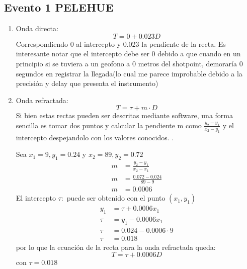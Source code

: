 \documentclass{article}
\theoremstyle{mytheoremstyle}
\theoremstyle{mytheoremstyle}
\theoremstyle{myproblemstyle}
\begin{document}
	\subsection*{Evento 1 PELEHUE}
	\begin{enumerate}
		\item Onda directa: \begin{equation*}
			T=0 + 0.023D
			\end{equation*}
			Correspondiendo 0 al intercepto y 0.023 la pendiente de la recta. Es interesante notar que el intercepto debe ser 0 debido a que 
			cuando en un principio si se tuviera a un geofono a 0 metros del shotpoint, demoraría 0 segundos en registrar la llegada(lo cual me parece improbable debido a la precisión y delay que presenta el instrumento)
		\item Onda refractada:\begin{equation*}
			T=\tau+m\cdot D
		\end{equation*}
		Si bien estas rectas pueden ser descritas mediante software, una forma sencilla es tomar dos puntos
		y calcular la pendiente m como $\frac{y_2-y_1}{x_2-y_1}$ y el intercepto despejandolo con los valores conocidos.
		.\par Sea $x_1=9,y_1=0.24$ y $x_2=89,y_2=0.72$  
		\begin{align*}
			m&=\frac{y_2-y_1}{x_2-x_1} \\
			m&=\frac{0.072-0.024}{89-9}\\ 
			m&=0.0006
		\end{align*}
		El intercepto $\tau:$ puede ser obtenido con el punto $(x_1,y_1)$
		\begin{align*}
			y_1&=\tau+0.0006x_1 \\
			\tau&=y_1-0.0006x_1 \\
			\tau&=0.024-0.0006\cdot 9 \\
			\tau&=0.018
		\end{align*}
		por lo que la ecuación de la recta para la onda refractada queda:
		\begin{equation*}
			T=\tau+0.0006D
		\end{equation*}
		con $\tau=0.018$
	\end{enumerate}
\end{document}

